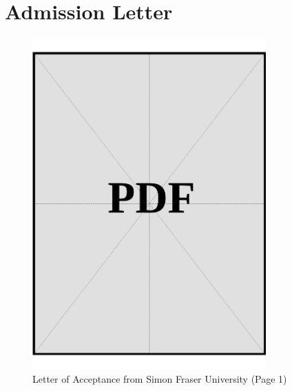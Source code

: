 
\chapter{Admission Letter}\label{sec:admission-letter}

\begin{figure}[H]
    \centering
    \includegraphics[page=1, width=0.8\textwidth]{../application-docs/applicant/canadian-institution/letter-of-acceptance.pdf}
    \caption{Letter of Acceptance from Simon Fraser University (Page 1)}
    \label{fig:letter-of-acceptance}
\end{figure}

\clearpage

